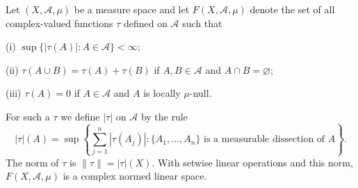 Let $(X, \mathcal{A}, \mu)$ be a measure space and let $F(X, \mathcal{A}, \mu)$ denote the set of all complex-valued functions $\tau$ defined on $\mathcal{A}$ such that

(i) $\sup\{|\tau(A)| : A \in \mathcal{A}\} < \infty$;

(ii) $\tau(A \cup B) = \tau(A) + \tau(B)$ if $A, B \in \mathcal{A}$ and $A \cap B = \varnothing$;

(iii) $\tau(A) = 0$ if $A \in \mathcal{A}$ and $A$ is locally $\mu$-null.

For such a $\tau$ we define $|\tau|$ on $\mathcal{A}$ by the rule
$$|\tau|(A) = \sup\left\{\sum_{j=1}^{n}|\tau(A_j)| : \{A_1, \ldots, A_n\} \text{ is a measurable dissection of } A\right\}.$$
The norm of $\tau$ is $\|\tau\| = |\tau|(X)$. With setwise linear operations and this norm, $F(X, \mathcal{A}, \mu)$ is a complex normed linear space.
